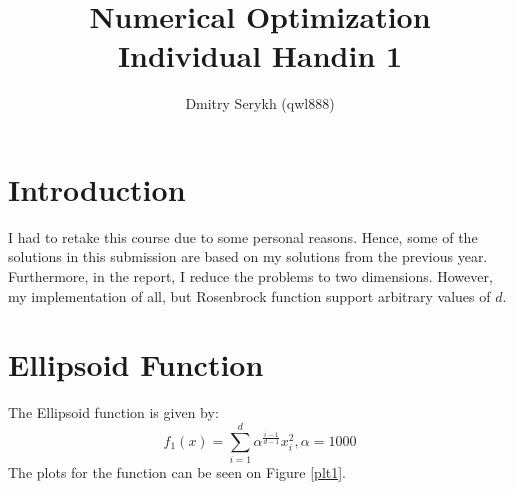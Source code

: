 \documentclass[a4paper]{article}
\title{\vspace{-5cm} Numerical Optimization \\ Individual Handin 1}
\author{Dmitry Serykh (qwl888)}
\begin{document}
\maketitle
\section*{Introduction}
I had to retake this course due to some personal reasons.
Hence, some of the solutions in this submission are based on my solutions from
the previous year. Furthermore, in the report, I reduce the problems to two
dimensions. However, my implementation of all, but Rosenbrock function support
arbitrary values of $d$.

\section{Ellipsoid Function}
\label{sec:ellipse}
The Ellipsoid function is given by:
\[
f_{1}(x)=\sum_{i=1}^{d} \alpha^{\frac{i-1}{d-1}} x_{i}^{2}, \alpha=1000
\]
The plots for the function can be seen on Figure \ref{plt1}.
\end{document}
